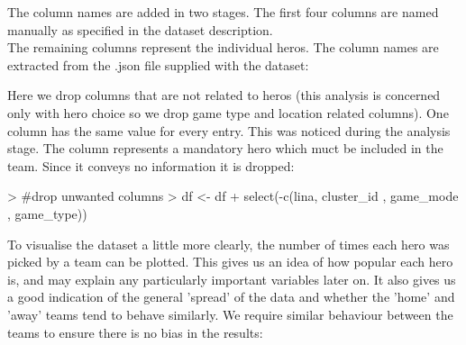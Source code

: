 \documentclass[10pt]{article}
\begin{document}
The column names are added in two stages. The first four columns are named manually as specified in the dataset description.\\
The remaining columns represent the individual heros. The column names are extracted from the .json file supplied with the dataset:

\hspace{1cm} 
\begin{Schunk}
\end{Schunk}
\hspace{1cm} 


Here we drop columns that are not related to heros (this analysis is concerned only with hero choice so we drop game type and location related columns). 
One column has the same value for every entry. This was noticed during the analysis stage. The column represents a mandatory hero which muct be included in the team. Since it conveys no information it is dropped:

\hspace{1cm} 
\begin{Schunk}
\begin{Sinput}
> #drop unwanted columns
> df <- df%
+   select(-c(lina, cluster_id , game_mode , game_type))
\end{Sinput}
\end{Schunk}
\hspace{1cm} 


To visualise the dataset a little more clearly, the number of times each hero was picked by a team can be plotted. This gives us an idea of how popular each hero is, and may explain any particularly important variables later on. It also gives us a good indication of the general 'spread' of the data and whether the 'home' and 'away' teams tend to behave similarly. We require similar behaviour between the teams to ensure there is no bias in the results:
\end{document}
